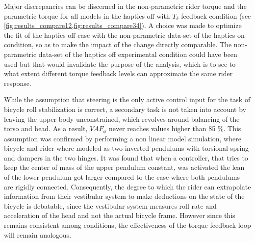 Major discrepancies can be discerned in the non-parametric rider torque and the parametric torque for all models in the haptics off with \ensuremath{T_\delta} feedback condition (see \cref{fig:results_compare12,fig:results_compare34}). A choice was made to optimize the fit of the haptics off case with the non-parametric data-set of the haptics on condition, so as to make the impact of the change directly comparable. The non-parametric data-set of the haptics off experimental condition could have been used but that would invalidate the  purpose of the analysis, which is to see to what extent different torque feedback levels can approximate the same rider response. 




While the assumption that steering is the only active control input for the task of bicycle roll stabilization is correct, a secondary task is not taken into account by leaving the upper body unconstrained, which revolves around balancing of the torso and head. As a result, \ensuremath{\mathit{VAF}_\phi} never reaches values higher than 85 \%. This assumption  was  confirmed by performing a non linear model simulation, where bicycle and rider where modeled as two inverted pendulums with torsional spring and dampers in the two hinges. It was found that when a  controller, that tries to keep the center of mass of the upper pendulum constant, was activated the lean of the lower pendulum got larger compared to the case where both pendulums are rigidly connected. Consequently, the degree to which the rider can extrapolate information from their vestibular system to make deductions on the state of the bicycle is debatable, since the vestibular system measures roll rate and acceleration of the head and not the actual bicycle frame. However since this remains consistent among conditions, the effectiveness of the torque feedback loop will remain analogous.

